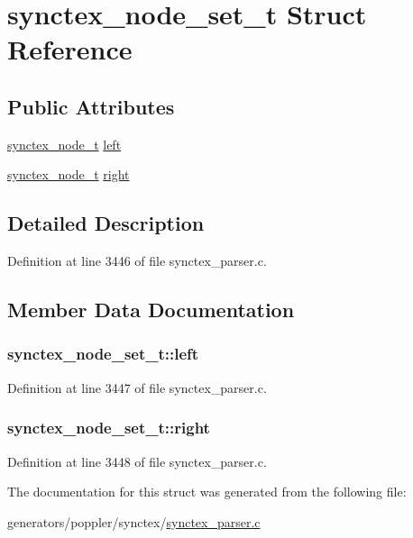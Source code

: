 \hypertarget{structsynctex__node__set__t}{\section{synctex\+\_\+node\+\_\+set\+\_\+t Struct Reference}
\label{structsynctex__node__set__t}
}
\subsection*{Public Attributes}
\begin{DoxyCompactItemize}
\item 
\hyperlink{synctex__parser_8h_a78e6c0b9c2b02f3c486a2cbffeabaeae}{synctex\+\_\+node\+\_\+t} \hyperlink{structsynctex__node__set__t_a819d6d3bef5b6a0606612f9618316695}{left}
\item 
\hyperlink{synctex__parser_8h_a78e6c0b9c2b02f3c486a2cbffeabaeae}{synctex\+\_\+node\+\_\+t} \hyperlink{structsynctex__node__set__t_a99e18c2a2158cf33ced43ea92c96ebd8}{right}
\end{DoxyCompactItemize}


\subsection{Detailed Description}


Definition at line 3446 of file synctex\+\_\+parser.\+c.



\subsection{Member Data Documentation}
\hypertarget{structsynctex__node__set__t_a819d6d3bef5b6a0606612f9618316695}{
\subsubsection[{left}]{ synctex\+\_\+node\+\_\+set\+\_\+t\+::left}}\label{structsynctex__node__set__t_a819d6d3bef5b6a0606612f9618316695}


Definition at line 3447 of file synctex\+\_\+parser.\+c.

\hypertarget{structsynctex__node__set__t_a99e18c2a2158cf33ced43ea92c96ebd8}{
\subsubsection[{right}]{ synctex\+\_\+node\+\_\+set\+\_\+t\+::right}}\label{structsynctex__node__set__t_a99e18c2a2158cf33ced43ea92c96ebd8}


Definition at line 3448 of file synctex\+\_\+parser.\+c.



The documentation for this struct was generated from the following file\+:\begin{DoxyCompactItemize}
\item 
generators/poppler/synctex/\hyperlink{synctex__parser_8c}{synctex\+\_\+parser.\+c}\end{DoxyCompactItemize}
